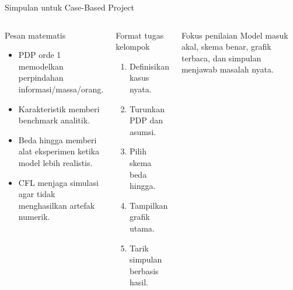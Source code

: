 \documentclass[aspectratio=169,10pt]{beamer}
\begin{document}
\begin{frame}{Simpulan untuk Case-Based Project}
\begin{columns}[T]
\begin{block}{Pesan matematis}
\begin{itemize}
  \item PDP orde 1 memodelkan perpindahan informasi/massa/orang.
  \item Karakteristik memberi benchmark analitik.
  \item Beda hingga memberi alat eksperimen ketika model lebih realistis.
  \item CFL menjaga simulasi agar tidak menghasilkan artefak numerik.
\end{itemize}
\end{block}
\begin{block}{Format tugas kelompok}
\begin{enumerate}
  \item Definisikan kasus nyata.
  \item Turunkan PDP dan asumsi.
  \item Pilih skema beda hingga.
  \item Tampilkan grafik utama.
  \item Tarik simpulan berbasis hasil.
\end{enumerate}
\end{block}
\begin{block}{Fokus penilaian}
Model masuk akal, skema benar, grafik terbaca, dan simpulan menjawab masalah nyata.
\end{block}
\end{columns}
\end{frame}
\end{document}
